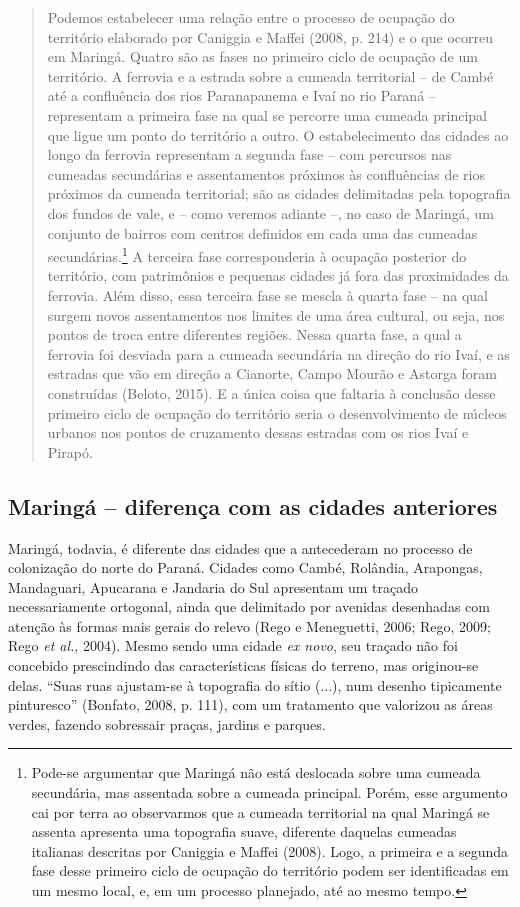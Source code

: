 \documentclass[12pt, a4paper]{book} %
\begin{document}
        \begin{quotation}
            Podemos estabelecer uma relação entre o processo de ocupação do território elaborado por Caniggia e Maffei (2008, p. 214) e o que ocorreu em Maringá. Quatro são as fases no primeiro ciclo de ocupação de um território. A ferrovia e a estrada sobre a cumeada territorial – de Cambé até a confluência dos rios Paranapanema e Ivaí no rio Paraná – representam a primeira fase na qual se percorre uma cumeada principal que ligue um ponto do território a outro. O estabelecimento das cidades ao longo da ferrovia representam a segunda fase – com percursos nas cumeadas secundárias e assentamentos próximos às confluências de rios próximos da cumeada territorial; são as cidades delimitadas pela topografia dos fundos de vale, e – como veremos adiante –, no caso de Maringá, um conjunto de bairros com centros definidos em cada uma das cumeadas secundárias.\footnote[95]{Pode-se argumentar que Maringá não está deslocada sobre uma cumeada secundária, mas assentada sobre a cumeada principal. Porém, esse argumento cai por terra ao observarmos que a cumeada territorial na qual Maringá se assenta apresenta uma topografia suave, diferente daquelas cumeadas italianas descritas por Caniggia e Maffei (2008). Logo, a primeira e a segunda fase desse primeiro ciclo de ocupação do território podem ser identificadas em um mesmo local, e, em um processo planejado, até ao mesmo tempo.} A terceira fase corresponderia à ocupação posterior do território, com patrimônios e pequenas cidades já fora das proximidades da ferrovia. Além disso, essa terceira fase se mescla à quarta fase – na qual surgem novos assentamentos nos limites de uma área cultural, ou seja, nos pontos de troca entre diferentes regiões. Nessa quarta fase, a qual a ferrovia foi desviada para a cumeada secundária na direção do rio Ivaí, e as estradas que vão em direção a Cianorte, Campo Mourão e Astorga foram construídas (Beloto, 2015). E a única coisa que faltaria à conclusão desse primeiro ciclo de ocupação do território seria o desenvolvimento de núcleos urbanos nos pontos de cruzamento dessas estradas com os rios Ivaí e Pirapó.
        \end{quotation}

                \subsection*{Maringá – diferença com as cidades anteriores}

        
        Maringá, todavia, é diferente das cidades que a antecederam no processo de colonização do norte do Paraná. Cidades como Cambé, Rolândia, Arapongas, Mandaguari, Apucarana e Jandaria do Sul apresentam um traçado necessariamente ortogonal, ainda que delimitado por avenidas desenhadas com atenção às formas mais gerais do relevo (Rego e Meneguetti, 2006; Rego, 2009; Rego \textit{et al.}, 2004). Mesmo sendo uma cidade \textit{ex novo}, seu traçado não foi concebido prescindindo das características físicas do terreno, mas originou-se delas. ``Suas ruas ajustam-se à topografia do sítio (...), num desenho tipicamente pinturesco'' (Bonfato, 2008, p. 111), com um tratamento que valorizou as áreas verdes, fazendo sobressair praças, jardins e parques. 
        
\end{document}
